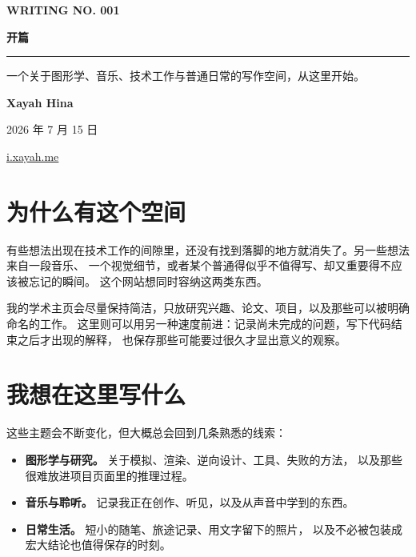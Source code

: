 \documentclass[11pt,a4paper,fontset=fandol]{ctexart}
\begin{document}
\hypersetup{pageanchor=false}
\begin{titlepage}
  \thispagestyle{empty}

  {\small\bfseries\color{accent}\MakeUppercase{Writing No. 001}\par}

  \vspace*{0.2\textheight}

  {\fontsize{39}{43}\selectfont\bfseries\color{ink}开篇\par}

  \vspace{2.2em}
  {\color{rulecolor}\rule{\textwidth}{0.7pt}\par}
  \vspace{1.4em}

  {\large\color{softink}
    一个关于图形学、音乐、技术工作与普通日常的写作空间，从这里开始。\par
  }

  \vfill

  {\large\bfseries Xayah Hina\par}
  \vspace{0.35em}
  {\color{softink}2026 年 7 月 15 日\par}
  \vspace{0.35em}
  {\small\href{https://i.xayah.me/}{i.xayah.me}\par}
\end{titlepage}
\hypersetup{pageanchor=true}

\section{为什么有这个空间}

有些想法出现在技术工作的间隙里，还没有找到落脚的地方就消失了。另一些想法来自一段音乐、
一个视觉细节，或者某个普通得似乎不值得写、却又重要得不应该被忘记的瞬间。
这个网站想同时容纳这两类东西。

我的学术主页会尽量保持简洁，只放研究兴趣、论文、项目，以及那些可以被明确命名的工作。
这里则可以用另一种速度前进：记录尚未完成的问题，写下代码结束之后才出现的解释，
也保存那些可能要过很久才显出意义的观察。

\section{我想在这里写什么}

这些主题会不断变化，但大概总会回到几条熟悉的线索：

\begin{itemize}
  \item \textbf{图形学与研究。} 关于模拟、渲染、逆向设计、工具、失败的方法，
    以及那些很难放进项目页面里的推理过程。
  \item \textbf{音乐与聆听。} 记录我正在创作、听见，以及从声音中学到的东西。
  \item \textbf{日常生活。} 短小的随笔、旅途记录、用文字留下的照片，
    以及不必被包装成宏大结论也值得保存的时刻。
\end{itemize}
\end{document}
